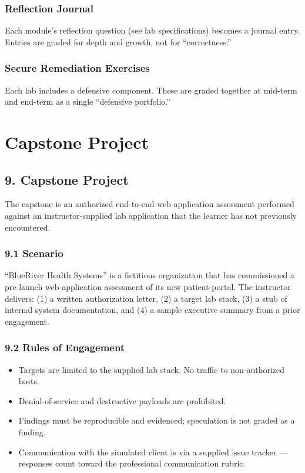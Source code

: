 \documentclass[11pt,letterpaper,oneside]{report}
\begin{document}
\subsection*{Reflection Journal}
Each module's reflection question (see lab specifications) becomes a journal entry. Entries are graded for depth and growth, not for ``correctness.''

\subsection*{Secure Remediation Exercises}
Each lab includes a defensive component. These are graded together at mid-term and end-term as a single ``defensive portfolio.''

\chapter*{Capstone Project}

\section*{9. Capstone Project}
The capstone is an authorized end-to-end web application assessment performed against an instructor-supplied lab application that the learner has not previously encountered.

\subsection*{9.1 Scenario}
``BlueRiver Health Systems'' is a fictitious organization that has commissioned a pre-launch web application assessment of its new patient-portal. The instructor delivers: (1) a written authorization letter, (2) a target lab stack, (3) a stub of internal system documentation, and (4) a sample executive summary from a prior engagement.

\subsection*{9.2 Rules of Engagement}
\begin{itemize}
  \item Targets are limited to the supplied lab stack. No traffic to non-authorized hosts.
  \item Denial-of-service and destructive payloads are prohibited.
  \item Findings must be reproducible and evidenced; speculation is not graded as a finding.
  \item Communication with the simulated client is via a supplied issue tracker --- responses count toward the professional communication rubric.
\end{itemize}
\end{document}
